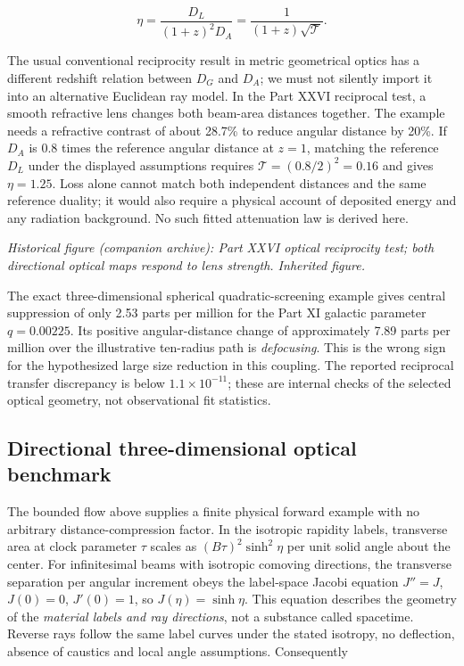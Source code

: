\documentclass[
  11pt,
  twoside]{article}
\begin{document}
\[\eta=\frac{D_L}{(1+z)^2D_A}=\frac{1}{(1+z)\sqrt{\mathcal T}}.\]

The usual conventional reciprocity result in metric geometrical optics
has a different redshift relation between \(D_G\) and \(D_A\); we must
not silently import it into an alternative Euclidean ray model. In the
Part XXVI reciprocal test, a smooth refractive lens changes both
beam-area distances together. The example needs a refractive contrast of
about 28.7\% to reduce angular distance by 20\%. If \(D_A\) is 0.8 times
the reference angular distance at \(z=1\), matching the reference
\(D_L\) under the displayed assumptions requires
\(\mathcal T=(0.8/2)^2=0.16\) and gives \(\eta=1.25\). Loss alone cannot
match both independent distances and the same reference duality; it
would also require a physical account of deposited energy and any
radiation background. No such fitted attenuation law is derived here.

\emph{Historical figure (companion archive): Part XXVI optical
reciprocity test; both directional optical maps respond to lens
strength. Inherited figure.}

The exact three-dimensional spherical quadratic-screening example gives
central suppression of only 2.53 parts per million for the Part XI
galactic parameter \(q=0.00225\). Its positive angular-distance change
of approximately 7.89 parts per million over the illustrative ten-radius
path is \emph{defocusing}. This is the wrong sign for the hypothesized
large size reduction in this coupling. The reported reciprocal transfer
discrepancy is below \(1.1\times10^{-11}\); these are internal checks of
the selected optical geometry, not observational fit statistics.

\subsection{Directional three-dimensional optical
benchmark}\label{directional-three-dimensional-optical-benchmark}

The bounded flow above supplies a finite physical forward example with
no arbitrary distance-compression factor. In the isotropic rapidity
labels, transverse area at clock parameter \(\tau\) scales as
\((B\tau)^2\sinh^2\eta\) per unit solid angle about the center. For
infinitesimal beams with isotropic comoving directions, the transverse
separation per angular increment obeys the label-space Jacobi equation
\(J''=J\), \(J(0)=0\), \(J'(0)=1\), so \(J(\eta)=\sinh\eta\). This
equation describes the geometry of the \emph{material labels and ray
directions}, not a substance called spacetime. Reverse rays follow the
same label curves under the stated isotropy, no deflection, absence of
caustics and local angle assumptions. Consequently
\end{document}
